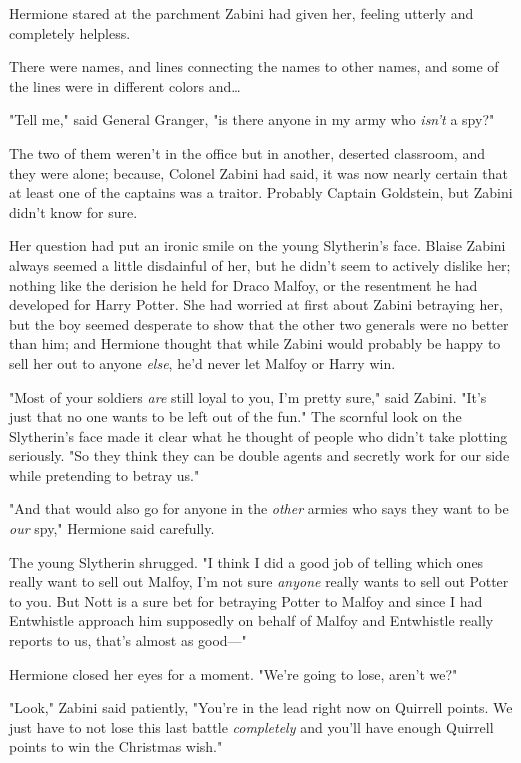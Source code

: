 Hermione stared at the parchment Zabini had given her, feeling utterly and 
completely helpless.

There were names, and lines connecting the names to other names, and some of 
the lines were in different colors and{\ldots}

"Tell me," said General Granger, "is there anyone in my army who \emph{isn't} a 
spy?"

The two of them weren't in the office but in another, deserted classroom, and 
they were alone; because, Colonel Zabini had said, it was now nearly certain 
that at least one of the captains was a traitor. Probably Captain Goldstein, 
but Zabini didn't know for sure.

Her question had put an ironic smile on the young Slytherin's face. Blaise 
Zabini always seemed a little disdainful of her, but he didn't seem to actively 
dislike her; nothing like the derision he held for Draco Malfoy, or the 
resentment he had developed for Harry Potter. She had worried at first about 
Zabini betraying her, but the boy seemed desperate to show that the other two 
generals were no better than him; and Hermione thought that while Zabini would 
probably be happy to sell her out to anyone \emph{else}, he'd never let Malfoy 
or Harry win.

"Most of your soldiers \emph{are} still loyal to you, I'm pretty sure," said 
Zabini. "It's just that no one wants to be left out of the fun." The scornful 
look on the Slytherin's face made it clear what he thought of people who didn't 
take plotting seriously. "So they think they can be double agents and secretly 
work for our side while pretending to betray us."

"And that would also go for anyone in the \emph{other} armies who says they 
want to be \emph{our} spy," Hermione said carefully.

The young Slytherin shrugged. "I think I did a good job of telling which ones 
really want to sell out Malfoy, I'm not sure \emph{anyone} really wants to sell 
out Potter to you. But Nott is a sure bet for betraying Potter to Malfoy and 
since I had Entwhistle approach him supposedly on behalf of Malfoy and 
Entwhistle really reports to us, that's almost as good---"

Hermione closed her eyes for a moment. "We're going to lose, aren't we?"

"Look," Zabini said patiently, "You're in the lead right now on Quirrell 
points. We just have to not lose this last battle \emph{completely} and you'll 
have enough Quirrell points to win the Christmas wish."

